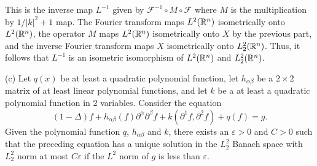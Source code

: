 \documentclass{lkx_pset}
\begin{document}
\begin{parts}
	This is the inverse map $L^{-1}$ given by $\mathcal{F}^{-1}\circ M\circ \mathcal{F}$ where $M$ is the multiplication by $1/|k|^2+1$ map. The Fourier transform maps $L^2(\mathbb{R}^n)$ isometrically onto $L^2(\mathbb{R}^n)$, the operator $M$ maps $L^2(\mathbb{R}^n)$ isometrically onto $X$ by the previous part, and the inverse Fourier transform maps $X$ isometrically onto $L^2_2(\mathbb{R}^n)$. Thus, it follows that $L^{-1}$ is an isometric isomorphism of $L^2(\mathbb{R}^n)$ and $L^2_2(\mathbb{R}^n)$.

	\begin{part}{(c)}
		Let $q(x)$ be at least a quadratic polynomial function, let $h_{\alpha\beta}$ be a $2\times 2$ matrix of at least linear polynomial functions, and let $k$ be a at least a quadratic polynomial function in 2 variables. Consider the equation
		\[
			(1-\Delta)f + h_{\alpha\beta}(f)\partial^\alpha\partial^\beta f + k(\partial^1 f, \partial^2 f) + q(f) = g.
		\]
		Given the polynomial function $q$, $h_{\alpha\beta}$ and $k$, there exists an $\varepsilon>0$ and $C > 0$ such that the preceding equation has a unique solution in the $L^2_2$ Banach space with $L^2_2$ norm at most $C\varepsilon$ if the $L^2$ norm of $g$ is less than $\varepsilon$.
	\end{part}


\end{parts}
\end{document}
